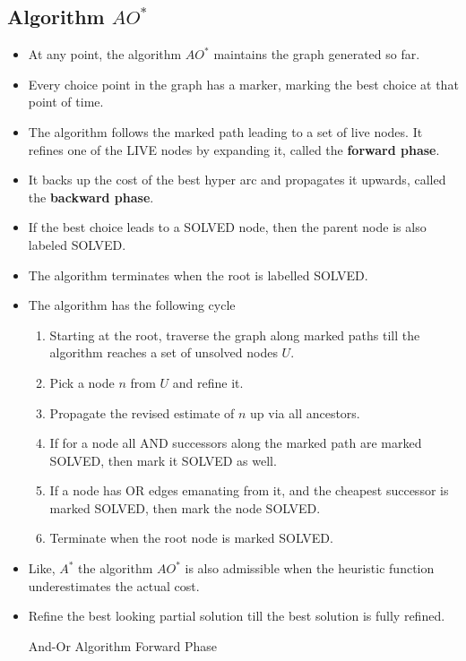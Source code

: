 \documentclass[a4paper]{article}
\begin{document}
\subsection{Algorithm $AO^*$}
\begin{itemize}
    \item At any point, the algorithm $AO^*$ maintains the graph generated so far.
    \item Every choice point in the graph has a marker, marking the best choice at that point of time.
    \item The algorithm follows the marked path leading to a set of live nodes. It refines one of the LIVE nodes by expanding it, called the \textbf{forward phase}.
    \item It backs up the cost of the best hyper arc and propagates it upwards, called the \textbf{backward phase}.
    \item If the best choice leads to a SOLVED node, then the parent node is also labeled SOLVED.
    \item The algorithm terminates when the root is labelled SOLVED.
    \item The algorithm has the following cycle
    \begin{enumerate}
        \item Starting at the root, traverse the graph along marked paths till the algorithm reaches a set of unsolved nodes $U$.
        \item Pick a node $n$ from $U$ and refine it.
        \item Propagate the revised estimate of $n$ up via all ancestors.
        \item If for a node all AND successors along the marked path are marked SOLVED, then mark it SOLVED as well.
        \item If a node has OR edges emanating from it, and the cheapest successor is marked SOLVED, then mark the node SOLVED.
        \item Terminate when the root node is marked SOLVED.
    \end{enumerate}
    \item Like, $A^*$ the algorithm $AO^*$ is also admissible when the heuristic function underestimates the actual cost.
    \item Refine the best looking partial solution till the best solution is fully refined.
    \begin{algorithm}[H]
        \caption{And-Or Algorithm Forward Phase}
        \begin{algorithmic}[1]

\end{algorithmic}
\end{algorithm}
\end{itemize}
\end{document}
